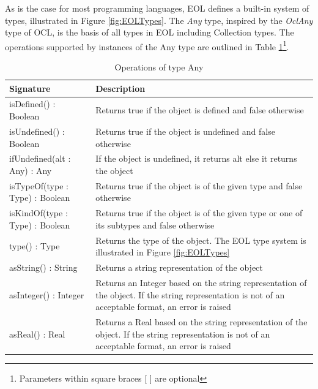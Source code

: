 As is the case for most programming languages, EOL defines a built-in system of types, illustrated in Figure \ref{fig:EOLTypes}. The \emph{Any} type, inspired by the \emph{OclAny} type of OCL, is the basis of all types in EOL including Collection types. The operations supported by instances of the Any type are outlined in Table \ref{tab:AnyOperations}\footnote{Parameters within square braces [ ] are optional}.

\clearpage

\begin{longtable} {|p{5.5cm}|p{6.5cm}|}
			
			\caption{Operations of type Any}
			\label{tab:AnyOperations}\\
			
			\hline
							
			\textbf{Signature} & \textbf{Description} \\\hline
			
			isDefined() : Boolean & Returns true if the object is defined and false otherwise \\\hline
			
			isUndefined() : Boolean & Returns true if the object is undefined and false otherwise \\\hline
			
			ifUndefined(alt : Any) : Any & If the object is undefined, it returns alt else it returns the object \\\hline
			
			isTypeOf(type : Type) : Boolean & Returns true if the object is of the given type and false otherwise \\\hline
			
			isKindOf(type : Type) : Boolean & Returns true if the object is of the given type or one of its subtypes and false otherwise \\\hline
			
			type() : Type & Returns the type of the object. The EOL type system is illustrated in Figure \ref{fig:EOLTypes} \\\hline
			
			asString() : String & Returns a string representation of the object \\\hline
			
			asInteger() : Integer & Returns an Integer based on the string representation of the object. If the string representation is not of an acceptable format, an error is raised \\\hline
			
			asReal() : Real & Returns a Real based on the string representation of the object. If the string representation is not of an acceptable format, an error is raised \\\hline
			

\end{longtable}
